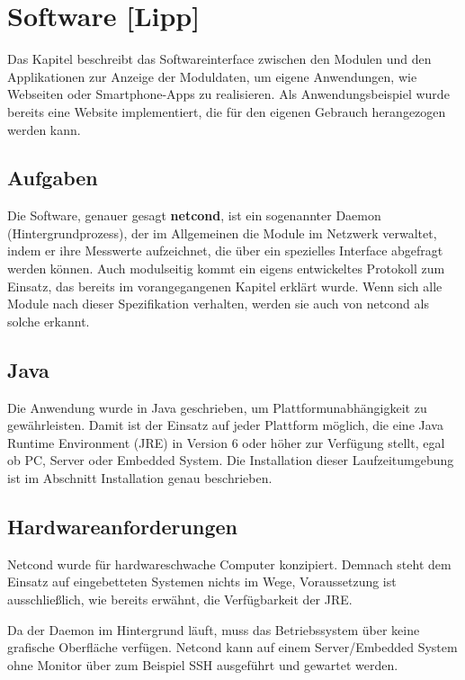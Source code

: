 \documentclass[a4paper,14pt,headsepline]{scrartcl}
\begin{document}
\newpage
\section{Software [Lipp]}

Das Kapitel beschreibt das Softwareinterface zwischen den Modulen und den Applikationen zur Anzeige der Moduldaten, um eigene Anwendungen, wie Webseiten oder Smartphone-Apps zu realisieren. Als Anwendungsbeispiel wurde bereits eine Website implementiert, die für den eigenen Gebrauch herangezogen werden kann.

\subsection{Aufgaben}
Die Software, genauer gesagt \textbf{netcond}, ist ein sogenannter Daemon (Hintergrundprozess), der im Allgemeinen die Module im Netzwerk verwaltet, indem er ihre Messwerte aufzeichnet, die über ein spezielles Interface abgefragt werden können. Auch modulseitig kommt ein eigens entwickeltes Protokoll zum Einsatz, das bereits im vorangegangenen Kapitel erklärt wurde. Wenn sich alle Module nach dieser Spezifikation verhalten, werden sie auch von netcond als solche erkannt.

\subsection{Java}

Die Anwendung wurde in Java geschrieben, um Plattformunabhängigkeit zu gewährleisten. Damit ist der Einsatz auf jeder Plattform möglich, die eine Java Runtime Environment (JRE) in Version 6 oder höher zur Verfügung stellt, egal ob PC, Server oder Embedded System. Die Installation dieser Laufzeitumgebung ist im Abschnitt Installation genau beschrieben. 

\newpage

\subsection{Hardwareanforderungen}
Netcond wurde für hardwareschwache Computer konzipiert. Demnach steht dem Einsatz auf eingebetteten Systemen nichts im Wege, Voraussetzung ist ausschließlich, wie bereits erwähnt, die Verfügbarkeit der JRE. 

Da der Daemon im Hintergrund läuft, muss das Betriebssystem über keine grafische Oberfläche verfügen. Netcond kann auf einem Server/Embedded System ohne Monitor über zum Beispiel SSH ausgeführt und gewartet werden. 
\end{document}
